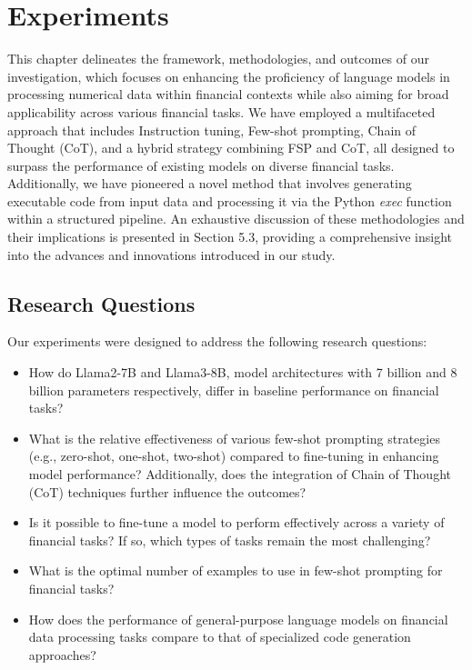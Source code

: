 \documentclass[logo,msc]{infthesis}           %
\begin{document}
\chapter{Experiments}

This chapter delineates the framework, methodologies, and outcomes of our investigation, which focuses on enhancing the proficiency of language models in processing numerical data within financial contexts while also aiming for broad applicability across various financial tasks. We have employed a multifaceted approach that includes Instruction tuning, Few-shot prompting, Chain of Thought (CoT), and a hybrid strategy combining FSP and CoT, all designed to surpass the performance of existing models on diverse financial tasks. Additionally, we have pioneered a novel method that involves generating executable code from input data and processing it via the Python \textit{exec} function within a structured pipeline. An exhaustive discussion of these methodologies and their implications is presented in Section 5.3, providing a comprehensive insight into the advances and innovations introduced in our study.

\section{Research Questions}
Our experiments were designed to address the following research questions:
\begin{itemize}
\item How do Llama2-7B and Llama3-8B, model architectures with 7 billion and 8 billion parameters respectively, differ in baseline performance on financial tasks?
\item What is the relative effectiveness of various few-shot prompting strategies (e.g., zero-shot, one-shot, two-shot) compared to fine-tuning in enhancing model performance? Additionally, does the integration of Chain of Thought (CoT) techniques further influence the outcomes?

\item Is it possible to fine-tune a model to perform effectively across a variety of financial tasks? If so, which types of tasks remain the most challenging?

\item What is the optimal number of examples to use in few-shot prompting for financial tasks?
\item How does the performance of general-purpose language models on financial data processing tasks compare to that of specialized code generation approaches?
\end{itemize}
\end{document}
